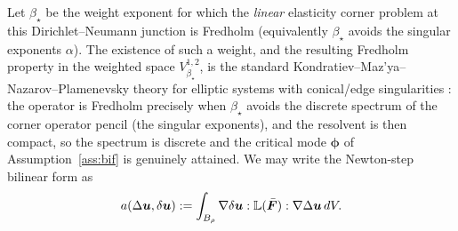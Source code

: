 Let $\beta_\star$ be the weight exponent for which the \emph{linear} elasticity corner problem at this
Dirichlet--Neumann junction is Fredholm (equivalently $\beta_\star$ avoids the singular exponents $\alpha$). The
existence of such a weight, and the resulting Fredholm property in the weighted space $V^{1,2}_{\beta_\star}$, is the
standard Kondratiev--Maz'ya--Nazarov--Plamenevsky theory for elliptic systems with conical/edge singularities
\cite{KMR2001,NazarovPlamenevsky1994}: the operator is Fredholm precisely when $\beta_\star$ avoids the discrete
spectrum of the corner operator pencil (the singular exponents), and the resolvent is then compact, so the spectrum is
discrete and the critical mode $\bm{\phi}$ of Assumption~\ref{ass:bif} is genuinely attained. We may
write the Newton-step bilinear form as
\begin{equation}
    \label{eq:formA}
    a(\Delta\bm{u},\delta\bm{u}) := \int_{B_\rho} \nabla\delta\bm{u} : \mathbb{L}(\bar{\bm{F}}) : \nabla\Delta\bm{u}\,dV .
\end{equation}

